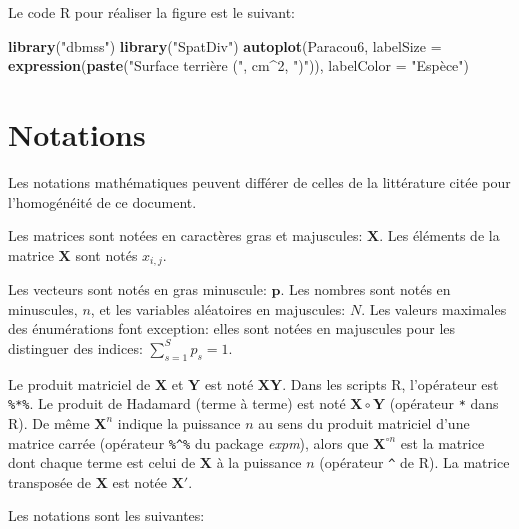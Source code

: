 \documentclass[
  11pt,
  french,
  a4paper,
  extrafontsizes,onecolumn,openright
  ]{memoir}
\newenvironment{Shaded}{\begin{snugshade}}{\end{snugshade}}
\newcommand{\DataTypeTok}[1]{\textcolor[rgb]{0.13,0.29,0.53}{#1}}
\newcommand{\DecValTok}[1]{\textcolor[rgb]{0.00,0.00,0.81}{#1}}
\newcommand{\KeywordTok}[1]{\textcolor[rgb]{0.13,0.29,0.53}{\textbf{#1}}}
\newcommand{\NormalTok}[1]{#1}
\newcommand{\OperatorTok}[1]{\textcolor[rgb]{0.81,0.36,0.00}{\textbf{#1}}}
\newcommand{\StringTok}[1]{\textcolor[rgb]{0.31,0.60,0.02}{#1}}
\newlength{\rf}
\begin{document}
Le code R pour réaliser la figure est le suivant:

\scriptsize

\begin{Shaded}
\begin{Highlighting}[]
\KeywordTok{library}\NormalTok{(}\StringTok{"dbmss"}\NormalTok{)}
\KeywordTok{library}\NormalTok{(}\StringTok{"SpatDiv"}\NormalTok{)}
\KeywordTok{autoplot}\NormalTok{(Paracou6, }\DataTypeTok{labelSize =} \KeywordTok{expression}\NormalTok{(}\KeywordTok{paste}\NormalTok{(}\StringTok{"Surface terrière ("}\NormalTok{,}
\NormalTok{    cm}\OperatorTok{^}\DecValTok{2}\NormalTok{, }\StringTok{")"}\NormalTok{)), }\DataTypeTok{labelColor =} \StringTok{"Espèce"}\NormalTok{)}
\end{Highlighting}
\end{Shaded}

\normalsize

\hypertarget{notations}{%
\chapter*{Notations}\label{notations}}

Les notations mathématiques peuvent différer de celles de la littérature citée pour l'homogénéité de ce document.

Les matrices sont notées en caractères gras et majuscules: \(\mathbf{X}\).
Les éléments de la matrice \(\mathbf{X}\) sont notés \(x_{i,j}\).

Les vecteurs sont notés en gras minuscule: \(\mathbf{p}\).
Les nombres sont notés en minuscules, \(n\), et les variables aléatoires en majuscules: \(N\).
Les valeurs maximales des énumérations font exception: elles sont notées en majuscules pour les distinguer des indices: \(\sum_{s=1}^{S}{p_s}=1\).

Le produit matriciel de \(\mathbf{X}\) et \(\mathbf{Y}\) est noté \(\mathbf{X}\mathbf{Y}\). Dans les scripts R, l'opérateur est \texttt{\%*\%}.
Le produit de Hadamard (terme à terme) est noté \(\mathbf{X}\circ\mathbf{Y}\) (opérateur \texttt{*} dans R).
De même \(\mathbf{X}^n\) indique la puissance \(n\) au sens du produit matriciel d'une matrice carrée (opérateur \texttt{\%\^{}\%} du package \emph{expm}), alors que \(\mathbf{X}^{\circ n}\) est la matrice dont chaque terme est celui de \(\mathbf{X}\) à la puissance \(n\) (opérateur \texttt{\^{}} de R).
La matrice transposée de \(\mathbf{X}\) est notée \(\mathbf{X'}\).

Les notations sont les suivantes:
\end{document}
